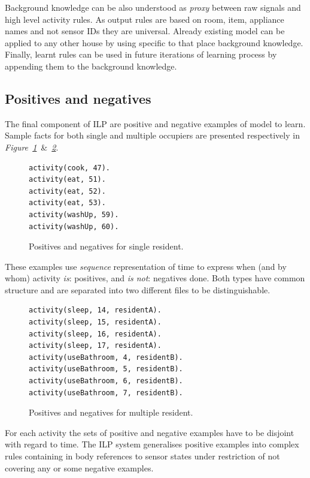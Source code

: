 \documentclass[12pt, a4paper, pdflatex, leqno, twoside, openright]{report}
\begin{document}
Background knowledge can be also understood as \emph{proxy} between raw signals and high level activity rules. As output rules are based on room, item, appliance names and not sensor IDs they are universal. Already existing model can be applied to any other house by using specific to that place background knowledge.\\
Finally, learnt rules can be used in future iterations of learning process by appending them to the background knowledge.


    \subsection{Positives and negatives}
The final component of ILP are positive and negative examples of model to learn. Sample facts for both single and multiple occupiers are presented respectively in \emph{Figure~\ref{lst:singleposneg}}~\&~\emph{\ref{lst:multiposneg}}.\\

\begin{figure}[htb] %
  \begin{verbatim}
activity(cook, 47).
activity(eat, 51).
activity(eat, 52).
activity(eat, 53).
activity(washUp, 59).
activity(washUp, 60).
  \end{verbatim}
  \caption{Positives and negatives for single resident.\label{lst:singleposneg}}
\end{figure}

These examples use \emph{sequence} representation of time to express when (and by whom) activity \emph{is}: positives, and \emph{is not}: negatives done. Both types have common structure and are separated into two different files to be distinguishable.\\

\begin{figure}[htb] %
  \begin{verbatim}
activity(sleep, 14, residentA).
activity(sleep, 15, residentA).
activity(sleep, 16, residentA).
activity(sleep, 17, residentA).
activity(useBathroom, 4, residentB).
activity(useBathroom, 5, residentB).
activity(useBathroom, 6, residentB).
activity(useBathroom, 7, residentB).
  \end{verbatim}
  \caption{Positives and negatives for multiple resident.\label{lst:multiposneg}}
\end{figure}

For each activity the sets of positive and negative examples have to be disjoint with regard to time. The ILP system generalises positive examples into complex rules containing in body references to sensor states under restriction of not covering any or some negative examples.
\end{document}
